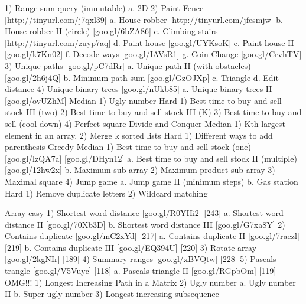 \documentclass[DIV=calc, paper=a4, fontsize=11pt, twocolumn]{scrartcl}	 %
\begin{document}
1)  Range sum query (immutable)
a.  2D
2)  Paint Fence [http://tinyurl.com/j7qxl39]
a.  House robber [http://tinyurl.com/jfesmjw]
b.  House robber II (circle) [goo.gl/6bZA86]
c.  Climbing stairs [http://tinyurl.com/zuyp7aq]
d.  Paint house [goo.gl/UYKsoK]
e.  Paint house II [goo.gl/k7Kn02]
f.  Decode ways [goo.gl/IAVsR1]
g.  Coin Change [goo.gl/CrvhTV]
3)  Unique paths [goo.gl/pC7dRr]
a.  Unique path II (with obstacles) [goo.gl/2h6j4Q]
b.  Minimum path sum [goo.gl/GzOJXp]
c.  Triangle
d.  Edit distance
4)  Unique binary trees [goo.gl/nUkb85]
a.  Unique binary trees II [goo.gl/ovUZhM]
Median 
1)  Ugly number
Hard
1)  Best time to buy and sell stock III (two)
2)  Best time to buy and sell stock III (K)
3)  Best time to buy and sell (cool down)
4)  Perfect square
Divide and Conquer
Median
1)  Kth largest element in an array.
2)  Merge k sorted lists
Hard
1)  Different ways to add parenthesis
Greedy
Median
1)  Best time to buy and sell stock (one) [goo.gl/lzQA7a] [goo.gl/DHyn12]
a.  Best time to buy and sell stock II (multiple) [goo.gl/12hw2x]
b.  Maximum sub-array
2)  Maximum product sub-array
3)  Maximal square
4)  Jump game
a.  Jump game II (minimum steps)
b.  Gas station
Hard
1)  Remove duplicate letters
2)  Wildcard matching

Array
easy
1)  Shortest word distance [goo.gl/R0YHi2] [243]
a.  Shortest word distance II [goo.gl/70Xb3D]
b.  Shortest word distance III [goo.gl/G7xa8Y]
2)  Contains duplicate [goo.gl/mC2xYd] [217]
a.  Contains duplicate II [goo.gl/7raezl] [219]
b.  Contains duplicate III [goo.gl/EQ394U] [220]
3)  Rotate array [goo.gl/2kgNIr] [189]
4)  Summary ranges [goo.gl/xBVQtw] [228]
5)  Pascals trangle [goo.gl/V5Vuyc] [118]
a.  Pascals triangle II [goo.gl/RGpbOm] [119]
OMG!!!
1)  Longest Increasing Path in a Matrix
2)  Ugly number
a.  Ugly number II
b.  Super ugly number
3)  Longest increasing subsequence


{}

\end{document}
